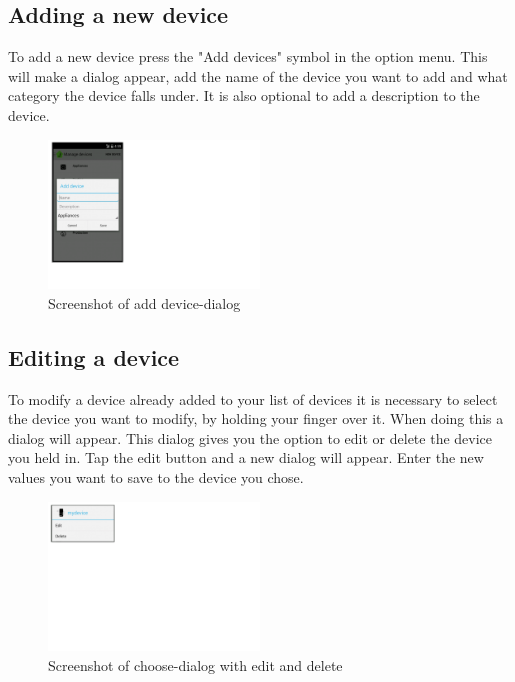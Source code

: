 \subsection{Adding a new device}
To add a new device press the "Add devices" symbol in the option menu. This will make a dialog appear, add the name of the device you want to add and what category the device falls under. It is also optional to add a description to the device.


\begin{figure}[H]
\centering
\includegraphics[width=0.5\textwidth, clip, trim=0cm 4cm 19cm 0cm]{appendix/usermanual/fig/AddDeviceDialog.png}
\caption{Screenshot of add device-dialog}
\end{figure}

\subsection{Editing a device}
To modify a device already added to your list of devices it is necessary to select the device you want to modify, by holding your finger over it. When doing this a dialog will appear. This dialog gives you the option to edit or delete the device you held in. Tap the edit button and a new dialog will appear. Enter the new values you want to save to the device you chose.

\begin{figure}[H]
\centering
\includegraphics[width=0.5\textwidth, clip, trim=0cm 15cm 20cm 0cm]{appendix/usermanual/fig/EditDeviceDialog.png}
\caption{Screenshot of choose-dialog with edit and delete}
\end{figure}

